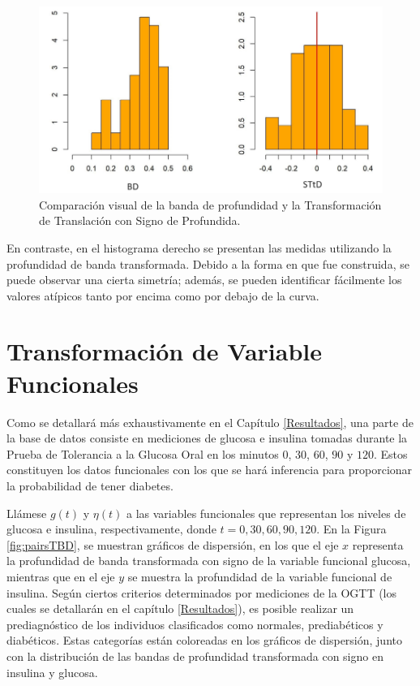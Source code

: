 \begin{figure}[H]
    \centering
    \includegraphics[width = 0.7 \textwidth]{Imagenes/comparacionBandas.png}
    \caption{Comparación visual de la banda de profundidad y la Transformación de Translación con Signo de Profundida.}
    \label{fig:ComparaBandas}
\end{figure}

En contraste, en el histograma derecho se presentan las medidas utilizando la profundidad de banda transformada. Debido a la forma en que fue construida, se puede observar una cierta simetría; además, se pueden identificar fácilmente los valores atípicos tanto por encima como por debajo de la curva.


\section{Transformación de Variable Funcionales}

Como se detallará más exhaustivamente en el Capítulo \ref{Resultados}, una parte de la base de datos consiste en mediciones de glucosa e insulina tomadas durante la Prueba de Tolerancia a la Glucosa Oral en los minutos $0$, $30$, $60$, $90$ y $120$. Estos constituyen los datos funcionales con los que se hará inferencia para proporcionar la probabilidad de tener diabetes. 

Llámese $g(t)$ y $\eta(t)$ a las variables funcionales que representan los niveles de glucosa e insulina, respectivamente, donde $t = 0, 30, 60, 90, 120$. En la Figura \ref{fig:pairsTBD}, se muestran gráficos de dispersión, en los que el eje $x$ representa la profundidad de banda transformada con signo de la variable funcional glucosa, mientras que en el eje $y$ se muestra la profundidad de la variable funcional de insulina. Según ciertos criterios determinados por mediciones de la OGTT (los cuales se detallarán en el capítulo \ref{Resultados}), es posible realizar un prediagnóstico de los individuos clasificados como normales, prediabéticos y diabéticos. Estas categorías están coloreadas en los gráficos de dispersión, junto con la distribución de las bandas de profundidad transformada con signo en insulina y glucosa.

